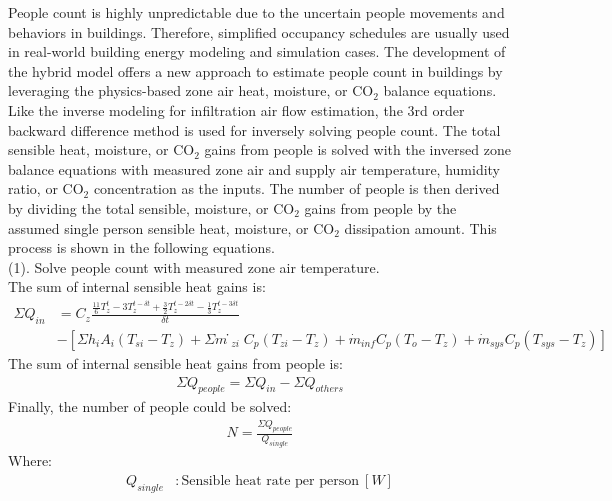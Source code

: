 People count is highly unpredictable due to the uncertain people movements and behaviors in buildings. Therefore, simplified occupancy schedules are usually used in real-world building energy modeling and simulation cases. The development of the hybrid model offers a new approach to estimate people count in buildings by leveraging the physics-based zone air heat, moisture, or CO$_2$ balance equations. Like the inverse modeling for infiltration air flow estimation, the 3rd order backward difference method is used for inversely solving people count. The total sensible heat, moisture, or CO$_2$ gains from people is solved with the inversed zone balance equations with measured zone air and supply air temperature, humidity ratio, or CO$_2$ concentration as the inputs. The number of people is then derived by dividing the total sensible, moisture, or CO$_2$ gains from people by the assumed single person sensible heat, moisture, or CO$_2$ dissipation amount. This process is shown in the following equations. \\

\noindent(1). Solve people count with measured zone air temperature. \\
\noindent The sum of internal sensible heat gains is:
\begin{align}
  \Sigma{Q_{in}} &= C_z\frac {\frac{11}{6}T_{z}^{t}-3T_{z}^{t-\delta t}+\frac{3}{2}T_{z}^{t-2\delta t}-\frac{1}{3}T_{z}^{t-3\delta t}} {\delta t} \nonumber \\
  &-  [\Sigma{h_i A_i (T_{si}-T_z)} + \Sigma{ṁ_{zi}C_p(T_{zi}-T_z)} + \dot{m}_{inf}C_p(T_o - T_z) + \dot{m}_{sys}C_p(T_{sys} - T_z)]
\end{align}
The sum of internal sensible heat gains from people is:
\begin{align}
  \Sigma{Q_{people}} = \Sigma{Q_{in}} - \Sigma{Q_{others}}
\end{align}
Finally, the number of people could be solved:
\begin{align}
  N = \frac {\Sigma{Q_{people}}}{Q_{single}}
\end{align}
Where:
\begin{align}
  Q_{single} &: \text{Sensible heat rate per person} ~ [W] \nonumber \\
\end{align}

